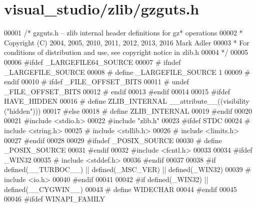 \hypertarget{visual__studio_2zlib_2gzguts_8h_source}{}\section{visual\+\_\+studio/zlib/gzguts.h}
\label{visual__studio_2zlib_2gzguts_8h_source}

\begin{DoxyCode}
00001 \textcolor{comment}{/* gzguts.h -- zlib internal header definitions for gz* operations}
00002 \textcolor{comment}{ * Copyright (C) 2004, 2005, 2010, 2011, 2012, 2013, 2016 Mark Adler}
00003 \textcolor{comment}{ * For conditions of distribution and use, see copyright notice in zlib.h}
00004 \textcolor{comment}{ */}
00005 
00006 \textcolor{preprocessor}{#ifdef \_LARGEFILE64\_SOURCE}
00007 \textcolor{preprocessor}{#  ifndef \_LARGEFILE\_SOURCE}
00008 \textcolor{preprocessor}{#    define \_LARGEFILE\_SOURCE 1}
00009 \textcolor{preprocessor}{#  endif}
00010 \textcolor{preprocessor}{#  ifdef \_FILE\_OFFSET\_BITS}
00011 \textcolor{preprocessor}{#    undef \_FILE\_OFFSET\_BITS}
00012 \textcolor{preprocessor}{#  endif}
00013 \textcolor{preprocessor}{#endif}
00014 
00015 \textcolor{preprocessor}{#ifdef HAVE\_HIDDEN}
00016 \textcolor{preprocessor}{#  define ZLIB\_INTERNAL \_\_attribute\_\_((visibility ("hidden")))}
00017 \textcolor{preprocessor}{#else}
00018 \textcolor{preprocessor}{#  define ZLIB\_INTERNAL}
00019 \textcolor{preprocessor}{#endif}
00020 
00021 \textcolor{preprocessor}{#include <stdio.h>}
00022 \textcolor{preprocessor}{#include "zlib.h"}
00023 \textcolor{preprocessor}{#ifdef STDC}
00024 \textcolor{preprocessor}{#  include <string.h>}
00025 \textcolor{preprocessor}{#  include <stdlib.h>}
00026 \textcolor{preprocessor}{#  include <limits.h>}
00027 \textcolor{preprocessor}{#endif}
00028 
00029 \textcolor{preprocessor}{#ifndef \_POSIX\_SOURCE}
00030 \textcolor{preprocessor}{#  define \_POSIX\_SOURCE}
00031 \textcolor{preprocessor}{#endif}
00032 \textcolor{preprocessor}{#include <fcntl.h>}
00033 
00034 \textcolor{preprocessor}{#ifdef \_WIN32}
00035 \textcolor{preprocessor}{#  include <stddef.h>}
00036 \textcolor{preprocessor}{#endif}
00037 
00038 \textcolor{preprocessor}{#if defined(\_\_TURBOC\_\_) || defined(\_MSC\_VER) || defined(\_WIN32)}
00039 \textcolor{preprocessor}{#  include <io.h>}
00040 \textcolor{preprocessor}{#endif}
00041 
00042 \textcolor{preprocessor}{#if defined(\_WIN32) || defined(\_\_CYGWIN\_\_)}
00043 \textcolor{preprocessor}{#  define WIDECHAR}
00044 \textcolor{preprocessor}{#endif}
00045 
00046 \textcolor{preprocessor}{#ifdef WINAPI\_FAMILY}

\end{DoxyCode}
